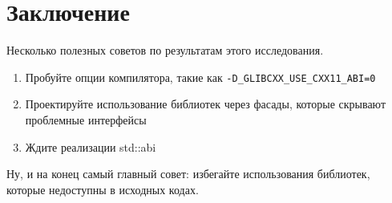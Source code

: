 \documentclass[14pt,a4paper]{article}
\begin{document}
\section*{Заключение}
Несколько полезных советов по результатам этого исследования. 
\begin{enumerate}
\item Пробуйте опции компилятора, такие как
  \texttt{-D\_GLIBCXX\_USE\_CXX11\_ABI=0}
\item Проектируйте использование библиотек через фасады, которые
  скрывают проблемные интерфейсы
\item Ждите реализации std::abi \cite{sutter}
\end{enumerate}

Ну, и на конец самый главный совет: избегайте использования библиотек,
которые недоступны в исходных кодах.

\end{document}
